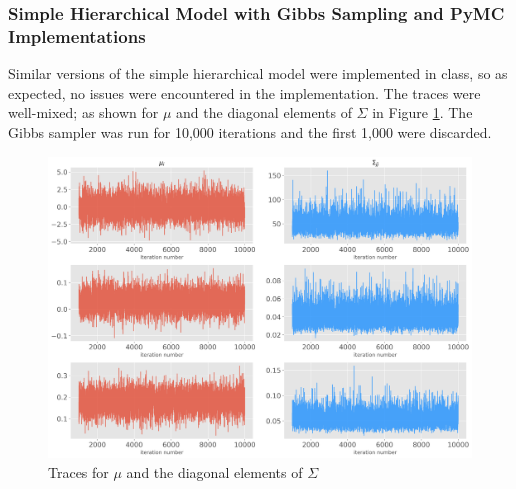 \documentclass[paper=a4, fontsize=11pt]{scrartcl}
\begin{document}
\subsubsection{Simple Hierarchical Model with Gibbs Sampling and PyMC Implementations}
Similar versions of the simple hierarchical model were implemented in class, so as expected, no issues were encountered in the implementation. The traces were well-mixed; as shown for $\mu$ and the diagonal elements of $\Sigma$ in Figure  \ref{traces}. The Gibbs sampler was run for 10,000 iterations and the first 1,000 were discarded.\\

\begin{figure}[!htb]\label{traces}
\centering
\includegraphics[width=1\textwidth]{project/writeup/traces_simple_model.png}
\caption{Traces for $\mu$ and the diagonal elements of $\Sigma$}
\end{figure}
\end{document}
